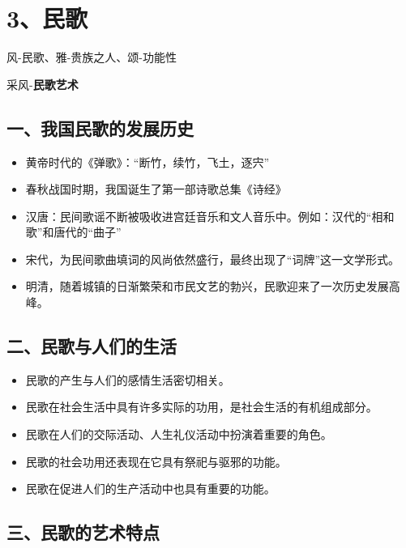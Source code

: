 \documentclass[
]{article}
\providecommand{\tightlist}{%
  \setlength{\itemsep}{0pt}\setlength{\parskip}{0pt}}
\begin{document}
\section{3、民歌}\label{ux6c11ux6b4c}

风-民歌、雅-贵族之人、颂-功能性

采风-\textbf{民歌艺术}

\subsection{一、我国民歌的发展历史}\label{ux4e00ux6211ux56fdux6c11ux6b4cux7684ux53d1ux5c55ux5386ux53f2}

\begin{itemize}
\tightlist
\item
  黄帝时代的《弹歌》：``断竹，续竹，飞土，逐宍''
\item
  春秋战国时期，我国诞生了第一部诗歌总集《诗经》
\item
  汉唐：民间歌谣不断被吸收进宫廷音乐和文人音乐中。例如：汉代的``相和歌''和唐代的``曲子''
\item
  宋代，为民间歌曲填词的风尚依然盛行，最终出现了``词牌''这一文学形式。
\item
  明清，随着城镇的日渐繁荣和市民文艺的勃兴，民歌迎来了一次历史发展高峰。
\end{itemize}

\subsection{二、民歌与人们的生活}\label{ux4e8cux6c11ux6b4cux4e0eux4ebaux4eecux7684ux751fux6d3b}

\begin{itemize}
\tightlist
\item
  民歌的产生与人们的感情生活密切相关。
\item
  民歌在社会生活中具有许多实际的功用，是社会生活的有机组成部分。
\item
  民歌在人们的交际活动、人生礼仪活动中扮演着重要的角色。
\item
  民歌的社会功用还表现在它具有祭祀与驱邪的功能。
\item
  民歌在促进人们的生产活动中也具有重要的功能。
\end{itemize}

\subsection{三、民歌的艺术特点}\label{ux4e09ux6c11ux6b4cux7684ux827aux672fux7279ux70b9}
\end{document}
